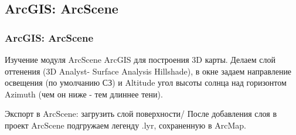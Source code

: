 \documentclass[pdflatex,compress,8pt,
	xcolor={dvipsnames,dvipsnames,svgnames,x11names,table},
	hyperref={	 
	pdfauthor={Lemenkova Polina}, 
	pdfsubject={Preentation}, 
	pdfcreator={Lemenkova Polina}, 
	pdfproducer={Lemenkova Polina}, 
	colorlinks=true,
	linkcolor=Red3, 
	citecolor=NavyBlue, 
	urlcolor = NavyBlue, 
	breaklinks = true}]{beamer}
\begin{document}
\subsection{ArcGIS: ArcScene}
\begin{frame}\frametitle{ArcGIS: ArcScene}
\small{
\begin{alertblock}{}
Изучение модуля ArcScene ArcGIS для построения 3D карты. Делаем слой оттенения (3D Analyst- Surface Analysis Hillshade), в окне задаем направление освещения (по умолчанию СЗ) и Altitude угол высоты солнца над горизонтом Azimuth (чем он ниже - тем длиннее тени).
\end{alertblock}
}
\begin{figure}[H]
	\centering
			\hspace{1mm}
\end{figure}

\begin{figure}[H]
	\centering
			\hspace{1mm}
\end{figure}

\small{
\begin{alertblock}{}
Экспорт в ArcScene: загрузить слой поверхности/ После добавления слоя в проект ArcScene подгружаем легенду .lyr, сохраненную в ArcMap.
\end{alertblock}
}
\end{frame}
\end{document}
